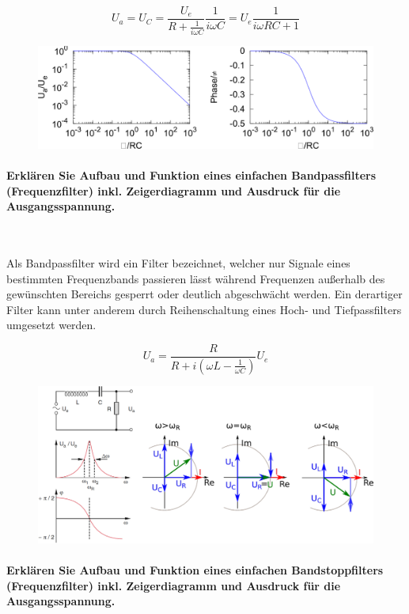 \documentclass[a4paper, 11pt, ngerman, parskip=half-]{scrartcl}
\begin{document}
\begin{equation}
    U_a
    = U_C
    = \frac{U_e}{R + \frac{1}{i \omega C}} \frac{1}{i \omega C}
    = U_e \frac{1}{i \omega R C + 1}
\end{equation}

\begin{figure}[H]
    \centering
    \includegraphics[width=12cm]{image/10/4.2}
\end{figure}

\paragraph{Erklären Sie Aufbau und Funktion eines einfachen Bandpassfilters (Frequenzfilter) inkl.
    Zeigerdiagramm und Ausdruck für die Ausgangsspannung.} ~

Als Bandpassfilter wird ein Filter bezeichnet, welcher nur Signale eines bestimmten Frequenzbands
passieren lässt während Frequenzen außerhalb des gewünschten Bereichs gesperrt oder deutlich
abgeschwächt werden. Ein derartiger Filter kann unter anderem durch Reihenschaltung eines Hoch- und
Tiefpassfilters umgesetzt werden.

\begin{equation}
    U_a = \frac{R}{R + i \left( \omega L - \frac{1}{\omega C} \right)} U_e
\end{equation}
\begin{figure}[H]
    \centering
    \includegraphics[width=12cm]{image/10/5}
\end{figure}

\paragraph{Erklären Sie Aufbau und Funktion eines einfachen Bandstoppfilters (Frequenzfilter) inkl.
    Zeigerdiagramm und Ausdruck für die Ausgangsspannung.} ~
\end{document}
